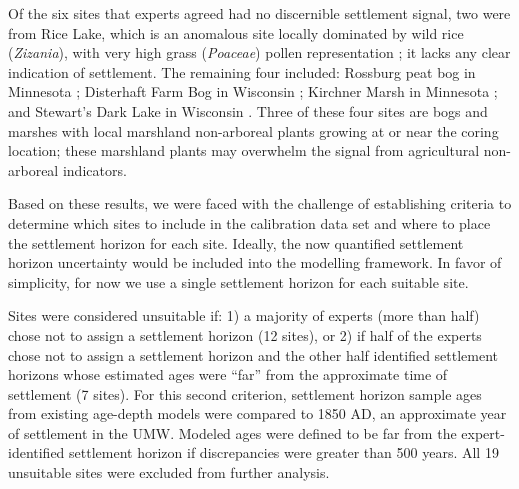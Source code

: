 \documentclass[12pt]{article}
\begin{document}

Of the six sites that experts agreed had no discernible settlement
signal, two were from Rice Lake, which is an anomalous site locally
dominated by wild rice (\textit{Zizania}), with very high grass
(\textit{Poaceae}) pollen representation
\citep{mcandrews1969paleobotany}; it lacks any clear indication of
settlement. The remaining four included: Rossburg peat bog in
Minnesota \citep{wright1969}; Disterhaft Farm Bog in Wisconsin
\citep{webb1972late}; Kirchner Marsh in Minnesota
\citep{wright1963two}; and Stewart's Dark Lake in Wisconsin
\citep{peters1979radiocarbon}. Three of these four sites are bogs and
marshes with local marshland non-arboreal plants growing at or near
the coring location; these marshland plants may overwhelm the signal
from agricultural non-arboreal indicators.

Based on these results, we were faced with the challenge of
establishing criteria to determine which sites to include in the
calibration data set and where to place the settlement horizon for
each site. Ideally, the now quantified settlement horizon uncertainty
would be included into the modelling framework. In favor of
simplicity, for now we use a single settlement horizon for each
suitable site.

Sites were considered unsuitable if: 1) a majority of experts (more
than half) chose not to assign a settlement horizon (12 sites), or 2)
if half of the experts chose not to assign a settlement horizon and
the other half identified settlement horizons whose estimated ages
were “far” from the approximate time of settlement (7 sites). For this
second criterion, settlement horizon sample ages from existing
age-depth models were compared to 1850 AD, an approximate year of
settlement in the UMW. Modeled ages were defined to be far from the
expert-identified settlement horizon if discrepancies were greater
than 500 years. All 19 unsuitable sites were excluded from further
analysis.
\end{document}
